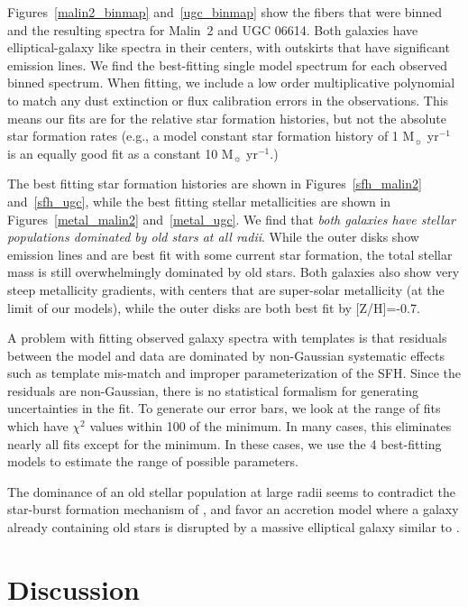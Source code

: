 \documentclass[12pt,preprint]{aastex}
\begin{document}
Figures~\ref{malin2_binmap} and~\ref{ugc_binmap} show the fibers that were binned and the resulting spectra for Malin~2 and UGC 06614.
Both galaxies have elliptical-galaxy like spectra in their centers, with outskirts that have significant emission lines.
We find the best-fitting single model spectrum for each observed binned spectrum. When fitting, we include a low order multiplicative polynomial to match any dust extinction or flux calibration errors in the observations.
This means our fits are for the relative star formation histories, but not the absolute star formation rates (e.g., a model constant star formation history of 1 M$_\sun$ yr$^{-1}$ is an equally good fit as a constant 10 M$_\sun$ yr$^{-1}$.)


The best fitting star formation histories are shown in Figures~\ref{sfh_malin2} and~\ref{sfh_ugc}, while the best fitting stellar metallicities are shown in Figures~\ref{metal_malin2} and~\ref{metal_ugc}.
We find that {\emph{both galaxies have stellar populations dominated by old stars at all radii}}.
While the outer disks show emission lines and are best fit with some current star formation, the total stellar mass is still overwhelmingly dominated by old stars.
Both galaxies also show very steep metallicity gradients, with centers that are super-solar metallicity (at the limit of our models), while the outer disks are both best fit by [Z/H]=-0.7.


A problem with fitting observed galaxy spectra with templates is that residuals between the model and data are dominated by non-Gaussian systematic effects such as template mis-match and improper parameterization of the SFH.
Since the residuals are non-Gaussian, there is no statistical formalism for generating uncertainties in the fit.
To generate our error bars, we look at the range of fits which have $\chi^2$ values within 100 of the minimum.
In many cases, this eliminates nearly all fits except for the minimum.
In these cases, we use the 4 best-fitting models to estimate the range of possible parameters.


The dominance of an old stellar population at large radii seems to contradict the star-burst formation mechanism of \citet{Mapelli08}, and favor an accretion model where a galaxy already containing old stars is disrupted by a massive elliptical galaxy similar to \citet{Pen06}.





\section{Discussion}\label{sec:discussion}
\end{document}
